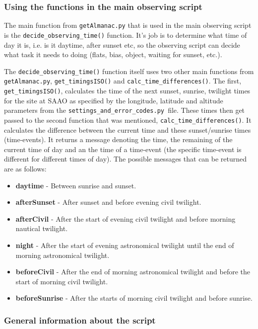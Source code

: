 \documentclass[a4paper,12pt]{article}
\begin{document}
\subsubsection{Using the functions in the main observing script}
\label{subsec:almanacMain}

The main function from {\tt getAlmanac.py} that is used in the main observing script is the {\tt decide\_observing\_time()} function. It's job is to determine what time of day it is, i.e. is it daytime, after sunset etc, so the observing script can decide what task it needs to doing (flats, bias, object, waiting for sunset, etc.). 

The {\tt decide\_observing\_time()} function itself uses two other main functions from {\tt getAlmanac.py}, {\tt get\_timingsISO()} and {\tt calc\_time\_differences()}. The first, {\tt get\_timingsISO()}, calculates the time of the next sunset, sunrise, twilight times for the site at SAAO as specified by the longitude, latitude and altitude parameters from the {\tt{settings\_and\_error\_codes.py} }file. These times then get passed to the second function that was mentioned, {\tt calc\_time\_differences()}. It calculates the difference between the current time and these sunset/sunrise times (time-events). It returns a message denoting the time, the remaining of the current time of day and an the time of a time-event (the specific time-event is different for different times of day). The possible messages that can be returned are as follows:
\begin{itemize}
\item{{\bf daytime} - Between sunrise and sunset.}
\item{{\bf afterSunset} - After sunset and before evening civil twilight.}
\item{{\bf afterCivil} - After the start of evening civil twilight and before morning nautical twilight.}
\item{{\bf night} - After the start of evening astronomical twilight until the end of morning astronomical twilight.}
\item{{\bf beforeCivil} - After the end of morning astronomical twilight and before the start of morning civil twilight.}
\item{{\bf beforeSunrise} - After the starts of morning civil twilight and before sunrise.}
\end{itemize}

\subsubsection{General information about the script}
\label{subsec:almanacGeneralInfo}
\end{document}
